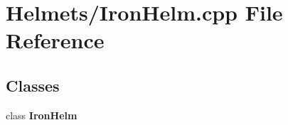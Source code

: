 \section{Helmets/\-Iron\-Helm.cpp File Reference}
\label{_iron_helm_8cpp}
\subsection*{Classes}
\begin{DoxyCompactItemize}
\item 
class {\bf Iron\-Helm}
\end{DoxyCompactItemize}
